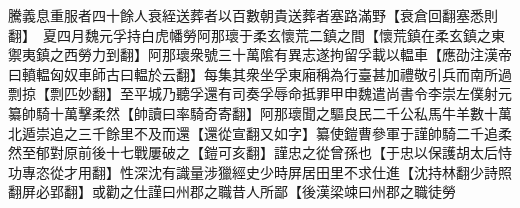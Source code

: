 騰義息重服者四十餘人衰絰送葬者以百數朝貴送葬者塞路滿野【衰倉回翻塞悉則翻】　夏四月魏元孚持白虎幡勞阿那瓌于柔玄懷荒二鎮之間【懷荒鎮在柔玄鎮之東禦夷鎮之西勞力到翻】阿那瓌衆號三十萬隂有異志遂拘留孚載以輼車【應劭注漢帝曰轒輼匈奴車師古曰輼於云翻】每集其衆坐孚東廂稱為行臺甚加禮敬引兵而南所過剽掠【剽匹妙翻】至平城乃聽孚還有司奏孚辱命抵罪甲申魏遣尚書令李崇左僕射元纂帥騎十萬擊柔然【帥讀曰率騎奇寄翻】阿那瓌聞之驅良民二千公私馬牛羊數十萬北遁崇追之三千餘里不及而還【還從宣翻又如字】纂使鎧曹參軍于謹帥騎二千追柔然至郁對原前後十七戰屢破之【鎧可亥翻】謹忠之從曾孫也【于忠以保護胡太后恃功專恣從才用翻】性深沈有識量涉獵經史少時屏居田里不求仕進【沈持林翻少詩照翻屏必郢翻】或勸之仕謹曰州郡之職昔人所鄙【後漢梁竦曰州郡之職徒勞